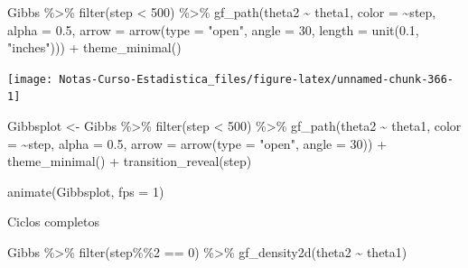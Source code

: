 \documentclass[
  12pt,
]{book}
\newenvironment{Shaded}{\begin{snugshade}}{\end{snugshade}}
\newcommand{\AttributeTok}[1]{\textcolor[rgb]{0.77,0.63,0.00}{#1}}
\newcommand{\DecValTok}[1]{\textcolor[rgb]{0.00,0.00,0.81}{#1}}
\newcommand{\FloatTok}[1]{\textcolor[rgb]{0.00,0.00,0.81}{#1}}
\newcommand{\FunctionTok}[1]{\textcolor[rgb]{0.00,0.00,0.00}{#1}}
\newcommand{\NormalTok}[1]{#1}
\newcommand{\OtherTok}[1]{\textcolor[rgb]{0.56,0.35,0.01}{#1}}
\newcommand{\SpecialCharTok}[1]{\textcolor[rgb]{0.00,0.00,0.00}{#1}}
\newcommand{\StringTok}[1]{\textcolor[rgb]{0.31,0.60,0.02}{#1}}
\theoremstyle{definition}
\theoremstyle{definition}
\theoremstyle{definition}
\theoremstyle{definition}
\theoremstyle{remark}
\begin{document}
\begin{Shaded}
\begin{Highlighting}[]
\NormalTok{Gibbs }\SpecialCharTok{\%\textgreater{}\%}
    \FunctionTok{filter}\NormalTok{(step }\SpecialCharTok{\textless{}} \DecValTok{500}\NormalTok{) }\SpecialCharTok{\%\textgreater{}\%}
    \FunctionTok{gf\_path}\NormalTok{(theta2 }\SpecialCharTok{\textasciitilde{}}\NormalTok{ theta1, }\AttributeTok{color =} \SpecialCharTok{\textasciitilde{}}\NormalTok{step, }\AttributeTok{alpha =} \FloatTok{0.5}\NormalTok{,}
        \AttributeTok{arrow =} \FunctionTok{arrow}\NormalTok{(}\AttributeTok{type =} \StringTok{"open"}\NormalTok{, }\AttributeTok{angle =} \DecValTok{30}\NormalTok{, }\AttributeTok{length =} \FunctionTok{unit}\NormalTok{(}\FloatTok{0.1}\NormalTok{,}
            \StringTok{"inches"}\NormalTok{))) }\SpecialCharTok{+} \FunctionTok{theme\_minimal}\NormalTok{()}
\end{Highlighting}
\end{Shaded}

\begin{center}\texttt{[image: Notas-Curso-Estadistica\_files/figure-latex/unnamed-chunk-366-1]} \end{center}

\begin{Shaded}
\begin{Highlighting}[]
\NormalTok{Gibbsplot }\OtherTok{\textless{}{-}}\NormalTok{ Gibbs }\SpecialCharTok{\%\textgreater{}\%}
    \FunctionTok{filter}\NormalTok{(step }\SpecialCharTok{\textless{}} \DecValTok{500}\NormalTok{) }\SpecialCharTok{\%\textgreater{}\%}
    \FunctionTok{gf\_path}\NormalTok{(theta2 }\SpecialCharTok{\textasciitilde{}}\NormalTok{ theta1, }\AttributeTok{color =} \SpecialCharTok{\textasciitilde{}}\NormalTok{step, }\AttributeTok{alpha =} \FloatTok{0.5}\NormalTok{,}
        \AttributeTok{arrow =} \FunctionTok{arrow}\NormalTok{(}\AttributeTok{type =} \StringTok{"open"}\NormalTok{, }\AttributeTok{angle =} \DecValTok{30}\NormalTok{)) }\SpecialCharTok{+}
    \FunctionTok{theme\_minimal}\NormalTok{() }\SpecialCharTok{+} \FunctionTok{transition\_reveal}\NormalTok{(step)}

\FunctionTok{animate}\NormalTok{(Gibbsplot, }\AttributeTok{fps =} \DecValTok{1}\NormalTok{)}
\end{Highlighting}
\end{Shaded}

Ciclos completos

\begin{Shaded}
\begin{Highlighting}[]
\NormalTok{Gibbs }\SpecialCharTok{\%\textgreater{}\%}
    \FunctionTok{filter}\NormalTok{(step}\SpecialCharTok{\%\%}\DecValTok{2} \SpecialCharTok{==} \DecValTok{0}\NormalTok{) }\SpecialCharTok{\%\textgreater{}\%}
    \FunctionTok{gf\_density2d}\NormalTok{(theta2 }\SpecialCharTok{\textasciitilde{}}\NormalTok{ theta1)}
\end{Highlighting}
\end{Shaded}
\end{document}
